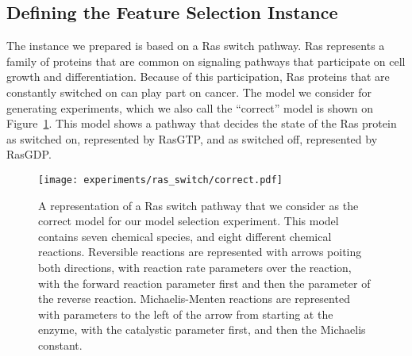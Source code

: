 \subsection{Defining the Feature Selection Instance}



% 

The instance we prepared is based on a Ras switch pathway. Ras
represents a family of proteins that are common on signaling pathways
that participate on cell growth and differentiation. Because of this
participation, Ras proteins that are constantly switched on can play 
part on cancer. The model we consider for generating experiments, which 
we also call the ``correct'' model is shown on 
Figure~\ref{fig:ras_switch:correct_model}. This model shows a pathway
that decides the state of the Ras protein as switched on, represented by
RasGTP, and as switched off, represented by RasGDP.



\begin{figure}
\begin{center}
\texttt{[image: experiments/ras\_switch/correct.pdf]}
\caption{A representation of a Ras switch pathway that we consider as
    the correct model for our model selection experiment. This model
    contains seven chemical species, and eight different chemical
    reactions. Reversible reactions are represented with arrows poiting
    both directions, with reaction rate parameters over the reaction,
    with the forward reaction parameter first and then the parameter of
    the reverse reaction. Michaelis-Menten reactions are represented
    with parameters to the left of the arrow from starting at the
    enzyme, with the catalystic parameter first, and then the Michaelis
    constant.
}
\label{fig:ras_switch:correct_model}
\end{center}
\end{figure}


